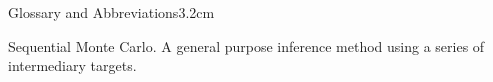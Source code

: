 
\begin{mclistof}{Glossary and Abbreviations}{3.2cm}

\item[\smc] Sequential Monte Carlo.  A general purpose inference method using a series of 
intermediary targets.

\end{mclistof} 
